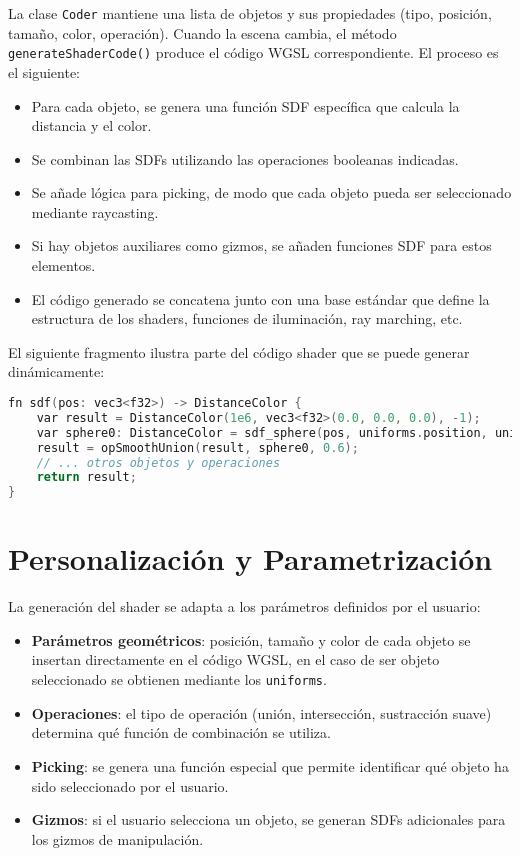 La clase \texttt{Coder} mantiene una lista de objetos y sus propiedades (tipo,
posición, tamaño, color, operación). Cuando la escena cambia, el método
\texttt{generateShaderCode()} produce el código WGSL correspondiente. El
proceso es el siguiente:

\begin{itemize}
    \item Para cada objeto, se genera una función SDF específica que calcula la distancia
          y el color.
    \item Se combinan las SDFs utilizando las operaciones booleanas indicadas.
    \item Se añade lógica para picking, de modo que cada objeto pueda ser seleccionado
          mediante raycasting.
    \item Si hay objetos auxiliares como gizmos, se añaden funciones SDF para estos
          elementos.
    \item El código generado se concatena junto con una base estándar que define la
          estructura de los shaders, funciones de iluminación, ray marching, etc.
\end{itemize}

El siguiente fragmento ilustra parte del código shader que se puede generar
dinámicamente:

\begin{lstlisting}[language=C++, caption={Fragmento de código WGSL generado}]
fn sdf(pos: vec3<f32>) -> DistanceColor {
    var result = DistanceColor(1e6, vec3<f32>(0.0, 0.0, 0.0), -1);
    var sphere0: DistanceColor = sdf_sphere(pos, uniforms.position, uniforms.size[0], uniforms.color, 0);
    result = opSmoothUnion(result, sphere0, 0.6);
    // ... otros objetos y operaciones
    return result;
}
\end{lstlisting}

\section{Personalización y Parametrización}

La generación del shader se adapta a los parámetros definidos por el usuario:

\begin{itemize}
    \item \textbf{Parámetros geométricos}: posición, tamaño y color de cada objeto se insertan directamente en el código WGSL, en el caso de ser objeto seleccionado se obtienen mediante los \texttt{uniforms}.
    \item \textbf{Operaciones}: el tipo de operación (unión, intersección, sustracción suave) determina qué función de combinación se utiliza.
    \item \textbf{Picking}: se genera una función especial que permite identificar qué objeto ha sido seleccionado por el usuario.
    \item \textbf{Gizmos}: si el usuario selecciona un objeto, se generan SDFs adicionales para los gizmos de manipulación.
\end{itemize}


